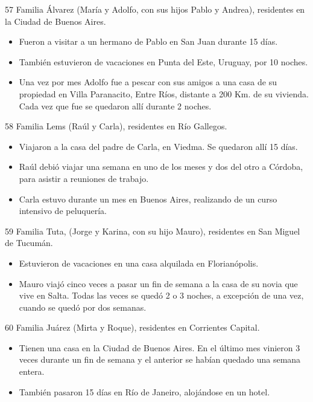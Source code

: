 \documentclass[
  openany]{book}
\begin{document}
57 Familia Álvarez (María y Adolfo, con sus hijos Pablo y Andrea), residentes en la Ciudad de Buenos Aires.

\begin{itemize}
\item
  Fueron a visitar a un hermano de Pablo en San Juan durante 15 días.
\item
  También estuvieron de vacaciones en Punta del Este, Uruguay, por 10 noches.
\item
  Una vez por mes Adolfo fue a pescar con sus amigos a una casa de su propiedad en Villa Paranacito, Entre Ríos, distante a 200 Km. de su vivienda. Cada vez que fue se quedaron allí durante 2 noches.
\end{itemize}

58 Familia Lems (Raúl y Carla), residentes en Río Gallegos.

\begin{itemize}
\item
  Viajaron a la casa del padre de Carla, en Viedma. Se quedaron allí 15 días.
\item
  Raúl debió viajar una semana en uno de los meses y dos del otro a Córdoba, para asistir a reuniones de trabajo.
\item
  Carla estuvo durante un mes en Buenos Aires, realizando de un curso intensivo de peluquería.
\end{itemize}

59 Familia Tuta, (Jorge y Karina, con su hijo Mauro), residentes en San Miguel de Tucumán.

\begin{itemize}
\item
  Estuvieron de vacaciones en una casa alquilada en Florianópolis.
\item
  Mauro viajó cinco veces a pasar un fin de semana a la casa de su novia que vive en Salta. Todas las veces se quedó 2 o 3 noches, a excepción de una vez, cuando se quedó por dos semanas.
\end{itemize}

60 Familia Juárez (Mirta y Roque), residentes en Corrientes Capital.

\begin{itemize}
\item
  Tienen una casa en la Ciudad de Buenos Aires. En el último mes vinieron 3 veces durante un fin de semana y el anterior se habían quedado una semana entera.
\item
  También pasaron 15 días en Río de Janeiro, alojándose en un hotel.
\end{itemize}
\end{document}
